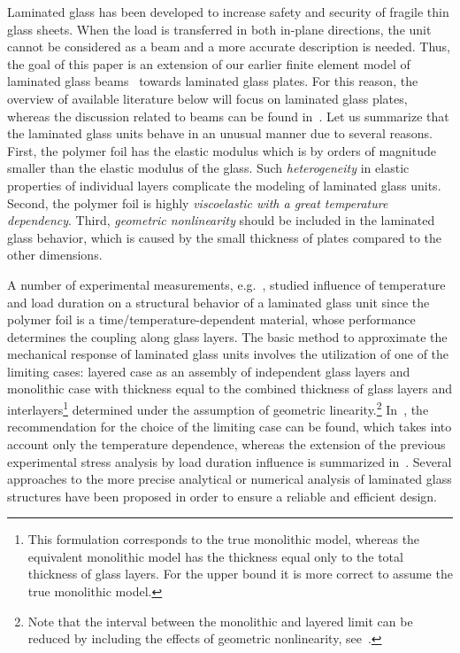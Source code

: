 \documentclass[11pt]{article}
\begin{document}
Laminated glass has been developed to increase safety and security of fragile thin glass sheets. 
When the load is transferred in both in-plane directions, the unit cannot be considered as a beam and a more accurate description is needed. Thus, the goal of this paper is an extension of our earlier finite element model of laminated glass beams~\citep{Zemanova:2014:NMFS} towards laminated glass plates. For this reason, the overview of available literature below will focus on laminated glass plates, whereas the discussion related to beams can be found in~\cite{Zemanova:2014:NMFS}. 
Let us summarize that the laminated glass units behave in an unusual manner due to several reasons. First, the polymer foil has the elastic modulus which is by orders of magnitude smaller than the elastic modulus of the glass. Such \textit{heterogeneity} in elastic properties of individual layers complicate the modeling of laminated glass units. Second, the polymer foil is highly \textit{viscoelastic with a great temperature dependency}. Third, \textit{geometric nonlinearity} should be included in the laminated glass behavior, which is caused by the small thickness of plates compared to the other dimensions.

A number of experimental measurements, e.g.~\citep{Vallabhan:1992:PPVB,Behr:1993:SBA,Bennison:1999:FLB}, studied influence of temperature and load duration on a structural behavior of a laminated glass unit since the polymer foil is a time/temperature-dependent material, whose performance determines the coupling along glass layers.
The basic method to approximate the mechanical response of laminated glass units involves the utilization of one of the limiting cases: layered case as an assembly of independent glass layers and monolithic case with thickness equal to the combined thickness of glass layers and interlayers\footnote{This formulation corresponds to the true monolithic model, whereas the equivalent monolithic model has the thickness equal only to the total thickness of glass layers. For the upper bound it is more correct to assume the true monolithic model.
} determined under the assumption of geometric linearity.\footnote{Note that the interval between the monolithic and layered limit can be reduced by including the effects of geometric nonlinearity, see~\cite{Vallabhan:1987:SLG}.} In~\cite{Behr:1985:LGU}, the recommendation for the choice of the limiting case can be found, which takes into account only the temperature dependence, whereas the extension of the previous experimental stress analysis by load duration influence is summarized in~\cite{Behr:1993:SBA}.
Several approaches to the more precise analytical or numerical analysis of laminated glass structures have been proposed in order to ensure a reliable and efficient design.
\end{document}
